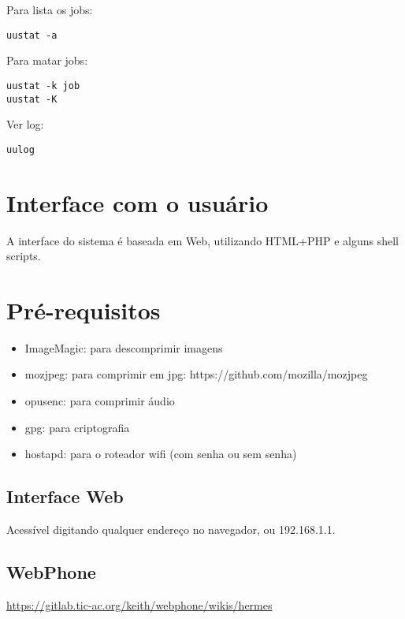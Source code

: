 \documentclass[11pt,a4paper]{article}
\begin{document}
Para lista os jobs:
\begin{verbatim}
uustat -a
\end{verbatim}

Para matar jobs:
\begin{verbatim}
uustat -k job
uustat -K
\end{verbatim}

Ver log:
\begin{verbatim}
uulog
\end{verbatim}

\section{Interface com o usuário}

A interface do sistema é baseada em Web, utilizando HTML+PHP e
alguns shell scripts.

\section{Pré-requisitos}

\begin{itemize}
\item ImageMagic: para descomprimir imagens
\item mozjpeg: para comprimir em jpg: https://github.com/mozilla/mozjpeg
\item opusenc: para comprimir áudio
\item gpg: para criptografia
\item hostapd: para o roteador wifi (com senha ou sem senha)
\end{itemize}

\subsection{Interface Web}

Acessível digitando qualquer endereço no navegador, ou 192.168.1.1.

\subsection{WebPhone}

\url{https://gitlab.tic-ac.org/keith/webphone/wikis/hermes}
\end{document}
